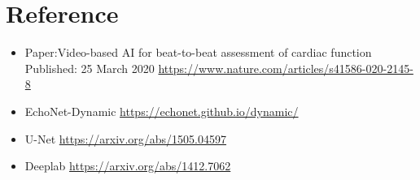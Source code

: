 \section{Reference}

\begin{itemize}
  \item Paper:Video-based AI for beat-to-beat assessment of cardiac function Published: 25 March 2020 \url{https://www.nature.com/articles/s41586-020-2145-8}
  \item EchoNet-Dynamic \url{https://echonet.github.io/dynamic/}
  \item U-Net \url{https://arxiv.org/abs/1505.04597}
  \item Deeplab \url{https://arxiv.org/abs/1412.7062}
\end{itemize}
